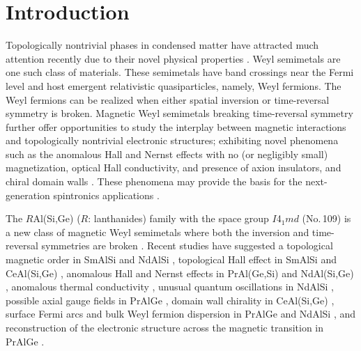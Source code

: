 \documentclass[%
preprint,
 amsmath,amssymb,
 aps,
]{revtex4-2}
\begin{document}
\maketitle


\section{Introduction}

%
Topologically nontrivial phases in condensed matter have attracted much attention recently 
due to their novel physical properties 
\cite{Wang_PRB_2013,Burkov_NatMater_2016,Muchler_AngewandteChemie_2012, 
Hasan_AnnualReview_2011,Ando_JPSJ_2013,Yan_AnnualReview_2017,Armitage_RevModPhys_2018}. 
%
Weyl semimetals are one such class of materials. 
%
These semimetals have band crossings near the Fermi level and host emergent 
relativistic quasiparticles, namely, Weyl fermions. 
%
The Weyl fermions can be realized when either spatial inversion or time-reversal symmetry is broken. 
%
Magnetic Weyl semimetals breaking time-reversal symmetry further offer opportunities 
to study the interplay between magnetic interactions and topologically nontrivial electronic structures; 
exhibiting novel phenomena such as the anomalous Hall and Nernst effects 
with no (or negligibly small) magnetization, 
optical Hall conductivity, and presence of axion insulators, and chiral domain walls 
\cite{Nagaosa_NatRevMater_2020,Bernevig_Nature_2022,Nakatsuji_AnnualReview_2022,Manna_NatRevMater_2018,Okamura_NatCommun_2020}. 
%
These phenomena may provide the basis for the next-generation spintronics applications 
\cite{Giustino_JPhysMater_2020,He_NatMater_2022,Smejkal_NatPhys_2018}. 
%

The $R$Al(Si,Ge) ($R$: lanthanides) family with the space group $I$4$_{1}md$ (No.\,109) is 
a new class of magnetic Weyl semimetals 
where both the inversion and time-reversal symmetries are broken 
\cite{Puphal_PhyRevMater_2019,Chang_PhysRevB_2018}. 
%
Recent studies have suggested a topological magnetic order in SmAlSi 
\cite{Yao_PhysRevX_2023}  and NdAlSi \cite{Gaudet_NatMater_2021,Wang_PhyRevB_2022}, 
topological Hall effect in SmAlSi \cite{Yao_PhysRevX_2023} 
and CeAl(Si,Ge) \cite{Yao_PhysRevX_2023,Piva_PhysRevMater_2023,Piva_PhyRevRes_2023}, 
anomalous Hall and Nernst effects in PrAl(Ge,Si) and NdAl(Si,Ge) 
\cite{Meng_APLMater_2019,Yang_APRMater_2020,Destraz_npjQuantumMater_2020}, 
anomalous thermal conductivity \cite{Tanwar_arXiv_2023}, 
unusual quantum oscillations in NdAlSi \cite{Wang_arXiv_2022,Zhang_PhysRevRes_2023}, 
possible axial gauge fields in PrAlGe \cite{Destraz_npjQuantumMater_2020}, 
domain wall chirality in CeAl(Si,Ge) \cite{Piva_PhyRevRes_2023,He_SciChina_2023}, 
surface Fermi arcs and bulk Weyl fermion dispersion in PrAlGe 
\cite{Sanchez_NatCommun_2020} and NdAlSi \cite{Li_arXiv_2023}, 
and reconstruction of the electronic structure across the magnetic transition in PrAlGe 
\cite{Yang_npjQuantumMater_2022}. 
%
\end{document}
